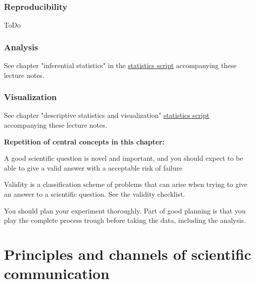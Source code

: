 \documentclass{tufte-book}
\begin{document}
\subsection{Reproducibility}

ToDo

\subsection{Analysis}

See chapter "inferential statistics" in the \href{https://github.com/florianhartig/ResearchSkills/raw/master/Labs/Statistics/Script/EssentialStatistics.pdf}{statistics script} accompanying these lecture notes.


\subsection{Visualization}

See chapter "descriptive statistics and visualization" \href{https://github.com/florianhartig/ResearchSkills/raw/master/Labs/Statistics/Script/EssentialStatistics.pdf}{statistics script} accompanying these lecture notes.


\vspace{1cm}
\begin{mdframed}
    
\textbf{Repetition of central concepts in this chapter:} 

\begin{itemize*}
  \item A good scientific question is novel and important, and you should expect to be able to give a valid answer with a acceptable risk of failure
  \item Validity is a classification scheme of problems that can arise when trying to give an answer to a scientific question. See the validity checklist.
  \item You should plan your experiment thoroughly. Part of good planning is that you play the complete process trough before taking the data, including the analysis.
\end{itemize*}

\end{mdframed}


\chapter{Principles and channels of scientific communication}
\end{document}
